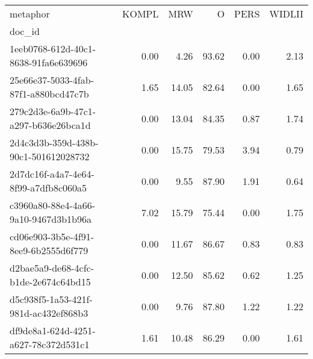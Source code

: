 \begin{tabular}{lrrrrr}
\toprule
metaphor & KOMPL & MRW & O & PERS & WIDLII \\
doc_id &  &  &  &  &  \\
\midrule
1eeb0768-612d-40c1-8638-91fa6e639696 & 0.00 & 4.26 & 93.62 & 0.00 & 2.13 \\
25e66e37-5033-4fab-87f1-a880bcd47c7b & 1.65 & 14.05 & 82.64 & 0.00 & 1.65 \\
279c2d3e-6a9b-47c1-a297-b636e26bca1d & 0.00 & 13.04 & 84.35 & 0.87 & 1.74 \\
2d4c3d3b-359d-438b-90c1-501612028732 & 0.00 & 15.75 & 79.53 & 3.94 & 0.79 \\
2d7dc16f-a4a7-4e64-8f99-a7dfb8c060a5 & 0.00 & 9.55 & 87.90 & 1.91 & 0.64 \\
c3960a80-88e4-4a66-9a10-9467d3b1b96a & 7.02 & 15.79 & 75.44 & 0.00 & 1.75 \\
cd06e903-3b5e-4f91-8ee9-6b2555d6f779 & 0.00 & 11.67 & 86.67 & 0.83 & 0.83 \\
d2bae5a9-de68-4cfc-b1de-2e674c64bd15 & 0.00 & 12.50 & 85.62 & 0.62 & 1.25 \\
d5c938f5-1a53-421f-981d-ac432ef868b3 & 0.00 & 9.76 & 87.80 & 1.22 & 1.22 \\
df9de8a1-624d-4251-a627-78c372d531c1 & 1.61 & 10.48 & 86.29 & 0.00 & 1.61 \\
\bottomrule
\end{tabular}
